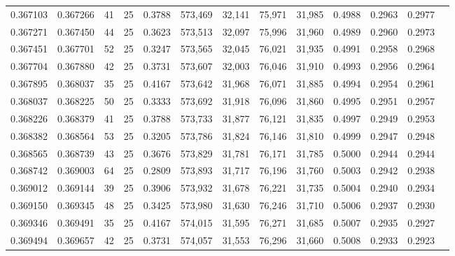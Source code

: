 \begin{tabular}{rrrrrrrrrrrrr}
0.367103 & 0.367266 &    41 &  25 &                                     0.3788 & 573,469 &  32,141 &  75,971 &  31,985 & 0.4988 & 0.2963 & 0.2977 \\
0.367271 & 0.367450 &    44 &  25 &                                     0.3623 & 573,513 &  32,097 &  75,996 &  31,960 & 0.4989 & 0.2960 & 0.2973 \\
0.367451 & 0.367701 &    52 &  25 &                                     0.3247 & 573,565 &  32,045 &  76,021 &  31,935 & 0.4991 & 0.2958 & 0.2968 \\
0.367704 & 0.367880 &    42 &  25 &                                     0.3731 & 573,607 &  32,003 &  76,046 &  31,910 & 0.4993 & 0.2956 & 0.2964 \\
0.367895 & 0.368037 &    35 &  25 &                                     0.4167 & 573,642 &  31,968 &  76,071 &  31,885 & 0.4994 & 0.2954 & 0.2961 \\
0.368037 & 0.368225 &    50 &  25 &                                     0.3333 & 573,692 &  31,918 &  76,096 &  31,860 & 0.4995 & 0.2951 & 0.2957 \\
0.368226 & 0.368379 &    41 &  25 &                                     0.3788 & 573,733 &  31,877 &  76,121 &  31,835 & 0.4997 & 0.2949 & 0.2953 \\
0.368382 & 0.368564 &    53 &  25 &                                     0.3205 & 573,786 &  31,824 &  76,146 &  31,810 & 0.4999 & 0.2947 & 0.2948 \\
0.368565 & 0.368739 &    43 &  25 &                                     0.3676 & 573,829 &  31,781 &  76,171 &  31,785 & 0.5000 & 0.2944 & 0.2944 \\
0.368742 & 0.369003 &    64 &  25 &                                     0.2809 & 573,893 &  31,717 &  76,196 &  31,760 & 0.5003 & 0.2942 & 0.2938 \\
0.369012 & 0.369144 &    39 &  25 &                                     0.3906 & 573,932 &  31,678 &  76,221 &  31,735 & 0.5004 & 0.2940 & 0.2934 \\
0.369150 & 0.369345 &    48 &  25 &                                     0.3425 & 573,980 &  31,630 &  76,246 &  31,710 & 0.5006 & 0.2937 & 0.2930 \\
0.369346 & 0.369491 &    35 &  25 &                                     0.4167 & 574,015 &  31,595 &  76,271 &  31,685 & 0.5007 & 0.2935 & 0.2927 \\
0.369494 & 0.369657 &    42 &  25 &                                     0.3731 & 574,057 &  31,553 &  76,296 &  31,660 & 0.5008 & 0.2933 & 0.2923 \\

\end{tabular}
